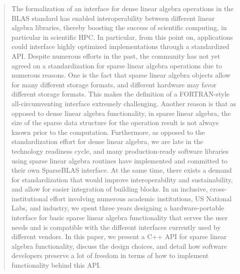 \documentclass[manuscript,review]{acmart}
\begin{document}
\begin{abstract}
    The formalization of an interface for dense linear algebra operations in the BLAS standard has enabled interoperability between different linear algebra libraries, thereby boosting the success of scientific computing, in particular in scientific HPC. In particular, from this point on, applications could interface highly optimized implementations through a standardized API. 
    Despite numerous efforts in the past, the community has not yet agreed on a standardization for sparse linear algebra operations due to numerous reasons. One is the fact that sparse linear algebra objects allow for many different storage formats, and different hardware may favor different storage formats. This makes the definition of a FORTRAN-style all-circumventing interface extremely challenging. Another reason is that as opposed to dense linear algebra functionality, in sparse linear algebra, the size of the sparse data structure for the operation result is not always known prior to the computation. Furthermore, as opposed to the standardization effort for dense linear algebra, we are late in the technology readiness cycle, and many production-ready software libraries using sparse linear algebra routines have implemented and committed to their own SparseBLAS interface.
    At the same time, there exists a demand for standardization that would improve interoperability and sustainability, and allow for easier integration of building blocks.
    In an inclusive, cross-institutional effort involving numerous academic institutions, US National Labs, and industry, we spent three years designing a hardware-portable interface for basic sparse linear algebra functionality that serves the user needs and is compatible with the different interfaces currently used by different vendors. In this paper, we present a C++ API for sparse linear algebra functionality, discuss the design choices, and detail how software developers preserve a lot of freedom in terms of how to implement functionality behind this API.
\end{abstract}
\end{document}
